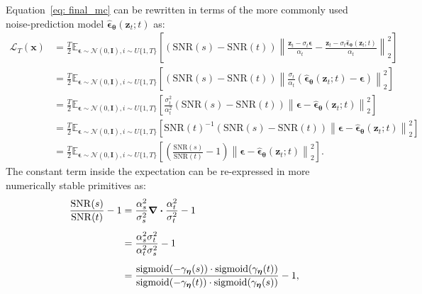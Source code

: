 Equation~\ref{eq: final_mc} can be rewritten in terms of the more commonly used noise-prediction model $\hat{\boldsymbol{\epsilon}}_{\boldsymbol{\theta}}(\mathbf{z}_t;t)$ as:
%
\begin{align}
    \mathcal{L}_T(\mathbf{x}) 
    & = \frac{T}{2}\mathbb{E}_{\boldsymbol{\epsilon} \sim \mathcal{N}(0,\mathbf{I}),i \sim U{\{1,T\}}}\left[\left(\mathrm{SNR}(s) - \mathrm{SNR}(t)\right)\left\| \frac{\mathbf{z}_t - \sigma_t \boldsymbol{\epsilon}}{\alpha_t} - \frac{\mathbf{z}_t - \sigma_t \hat{\boldsymbol{\epsilon}}_{\boldsymbol{\theta}}(\mathbf{z}_t;t)}{\alpha_t} \right\|^2_2 \right] 
    \\[5pt] & = \frac{T}{2}\mathbb{E}_{\boldsymbol{\epsilon} \sim \mathcal{N}(0,\mathbf{I}),i \sim U{\{1,T\}}}\left[\left(\mathrm{SNR}(s) - \mathrm{SNR}(t)\right)\left\| \frac{\sigma_t}{\alpha_t}\left(\hat{\boldsymbol{\epsilon}}_{\boldsymbol{\theta}}(\mathbf{z}_t;t) - \boldsymbol{\epsilon} \right)\right\|^2_2 \right]
    \\[5pt] & = \frac{T}{2}\mathbb{E}_{\boldsymbol{\epsilon} \sim \mathcal{N}(0,\mathbf{I}),i \sim U{\{1,T\}}}\left[\frac{\sigma_t^2}{\alpha_t^2}\left(\mathrm{SNR}(s) - \mathrm{SNR}(t)\right)\left\| \boldsymbol{\epsilon} - \hat{\boldsymbol{\epsilon}}_{\boldsymbol{\theta}}(\mathbf{z}_t;t) \right\|^2_2 \right]
    \\[5pt] & = \frac{T}{2}\mathbb{E}_{\boldsymbol{\epsilon} \sim \mathcal{N}(0,\mathbf{I}),i \sim U{\{1,T\}}}\left[\mathrm{SNR}(t)^{-1}\left(\mathrm{SNR}(s) - \mathrm{SNR}(t)\right)\left\| \boldsymbol{\epsilon} - \hat{\boldsymbol{\epsilon}}_{\boldsymbol{\theta}}(\mathbf{z}_t;t) \right\|^2_2 \right]
    \\[5pt] & = \frac{T}{2}\mathbb{E}_{\boldsymbol{\epsilon} \sim \mathcal{N}(0,\mathbf{I}),i \sim U{\{1,T\}}}\left[
    \left(\frac{\mathrm{SNR}(s)}{\mathrm{SNR}(t)} - 1\right) \left\| \boldsymbol{\epsilon} - \hat{\boldsymbol{\epsilon}}_{\boldsymbol{\theta}}(\mathbf{z}_t;t) \right\|^2_2 \right].
\end{align}
The constant term inside the expectation can be re-expressed in more numerically stable primitives as:
%
\begin{align}
    \frac{\mathrm{SNR}(s)}{\mathrm{SNR}(t)} - 1 & = \frac{\alpha_s^2}{\sigma_s^2} \div \frac{\alpha_t^2}{\sigma_t^2} - 1
    \\[5pt] & = 
    \frac{\alpha_s^2\sigma_t^2}{\alpha_t^2\sigma_s^2} - 1
    \\[5pt] & = 
    \frac{\mathrm{sigmoid}(-\gamma_{\boldsymbol{\eta}}(s))\cdot \mathrm{sigmoid}(\gamma_{\boldsymbol{\eta}}(t))}{\mathrm{sigmoid}(-\gamma_{\boldsymbol{\eta}}(t))\cdot \mathrm{sigmoid}(\gamma_{\boldsymbol{\eta}}(s))} - 1,
\end{align}
